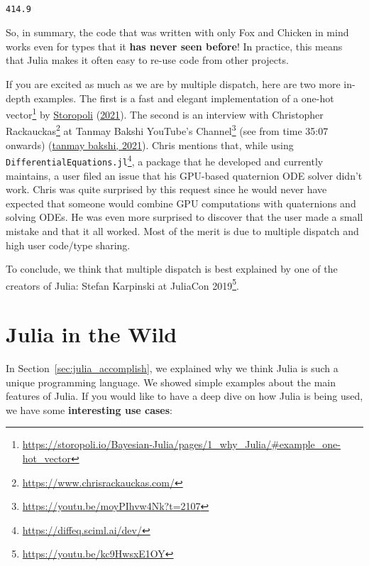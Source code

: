 \documentclass[
  notoc %
]{tufte-book}
\DeclareRobustCommand{\href}[2]{#2\footnote{\url{#1}}}
\newcommand{\passthrough}[1]{#1}
\begin{document}
\begin{lstlisting}[language=Output]

414.9

\end{lstlisting}

So, in summary, the code that was written with only Fox and Chicken in
mind works even for types that it \textbf{has never seen before}! In
practice, this means that Julia makes it often easy to re-use code from
other projects.

If you are excited as much as we are by multiple dispatch, here are two
more in-depth examples. The first is a
\href{https://storopoli.io/Bayesian-Julia/pages/1_why_Julia/\#example_one-hot_vector}{fast
and elegant implementation of a one-hot vector} by
\protect\hyperlink{ref-storopoli2021bayesianjulia}{Storopoli}
(\protect\hyperlink{ref-storopoli2021bayesianjulia}{2021}). The second
is an interview with \href{https://www.chrisrackauckas.com/}{Christopher
Rackauckas} at \href{https://youtu.be/moyPIhvw4Nk?t=2107}{Tanmay Bakshi
YouTube's Channel} (see from time 35:07 onwards)
(\protect\hyperlink{ref-tanmaybakshiBakingKnowledgeMachine2021}{tanmay
bakshi, 2021}). Chris mentions that, while using
\href{https://diffeq.sciml.ai/dev/}{\passthrough{\lstinline!DifferentialEquations.jl!}},
a package that he developed and currently maintains, a user filed an
issue that his GPU-based quaternion ODE solver didn't work. Chris was
quite surprised by this request since he would never have expected that
someone would combine GPU computations with quaternions and solving
ODEs. He was even more surprised to discover that the user made a small
mistake and that it all worked. Most of the merit is due to multiple
dispatch and high user code/type sharing.

To conclude, we think that multiple dispatch is best explained by one of
the creators of Julia: \href{https://youtu.be/kc9HwsxE1OY}{Stefan
Karpinski at JuliaCon 2019}.

\hypertarget{sec:julia_wild}{%
\section{Julia in the Wild}\label{sec:julia_wild}}

In Section~\ref{sec:julia_accomplish}, we explained why we think Julia
is such a unique programming language. We showed simple examples about
the main features of Julia. If you would like to have a deep dive on how
Julia is being used, we have some \textbf{interesting use cases}:
\end{document}
